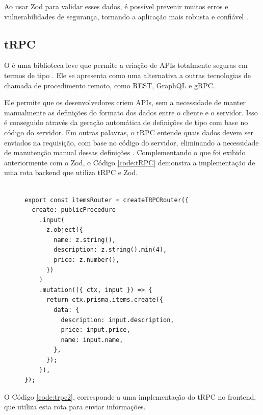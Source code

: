 Ao usar Zod para validar esses dados, é possível prevenir muitos erros e vulnerabilidades de segurança, tornando a aplicação mais robusta e confiável \cite{Zod2023}.

\subsection{tRPC}
O  é uma biblioteca leve que permite a criação de APIs totalmente seguras em termos de tipo \cite{tRPC}. Ele se apresenta como uma alternativa a outras tecnologias de chamada de procedimento remoto, como REST, GraphQL e gRPC.

Ele permite que os desenvolvedores criem APIs, sem a necessidade de manter manualmente as definições do formato dos dados entre o cliente e o servidor. Isso é conseguido através da geração automática de definições de tipo com base no código do servidor. Em outras palavras, o tRPC entende quais dados devem ser enviados na requisição, com base no código do servidor, eliminando a necessidade de manutenção manual dessas definições \cite{tRPC}. Complementando o que foi exibido anteriormente com o Zod, o Código \ref{code:tRPC} demonstra a implementação de uma rota backend que utiliza tRPC e Zod.

\begin{figure}[h]
\begin{lstlisting}[caption={Exemplo de uso da biblioteca tRPC no backend.},label={code:tRPC}]

export const itemsRouter = createTRPCRouter({
  create: publicProcedure
    .input(
      z.object({
        name: z.string(),
        description: z.string().min(4),
        price: z.number(),
      })
    )
    .mutation(({ ctx, input }) => {
      return ctx.prisma.items.create({
        data: {
          description: input.description,
          price: input.price,
          name: input.name,
        },
      });
    }),
});
\end{lstlisting}
\end{figure}

O Código \ref{code:trpc2}, corresponde a uma implementação do tRPC no frontend, que utiliza esta rota para enviar informações.

